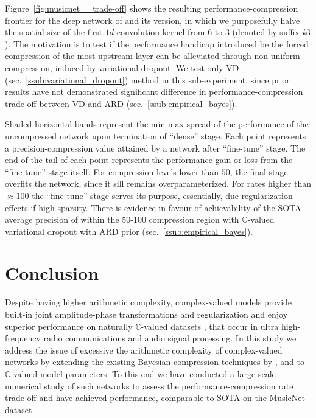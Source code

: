 \documentclass[a4paper,10pt]{article}
\newcommand{\cplx}{\mathbb{C}}
\begin{document}
Figure~\ref{fig:musicnet__trade-off} shows the resulting performance-compression frontier
for the deep network of \citet{trabelsi_deep_2017} and its version, in which we purposefully
halve the spatial size of the first $1d$ convolution kernel from $6$ to $3$ (denoted by
suffix \textit{k}$3$). The motivation is to test if the performance handicap introduced be
the forced compression of the most upstream layer can be alleviated through non-uniform
compression, induced by variational dropout. We test only VD (sec.~\ref{ssub:variational_dropout})
method in this sub-experiment, since prior results have not demonstrated significant difference
in performance-compression trade-off between VD and ARD (sec.~\ref{ssub:empirical_bayes}).

Shaded horizontal bands represent the min-max spread of the performance of the uncompressed
network upon termination of ``dense'' stage. Each point represents a precision-compression
value attained by a network after ``fine-tune'' stage. The end of the tail of each point
represents the performance gain or loss from the ``fine-tune'' stage itself.
%
For compression levels lower than $50$, the final stage overfits the network, since
it sill remains overparameterized. For rates higher than $\approx 100$ the ``fine-tune''
stage serves its purpose, essentially, due regularization effects if high sparsity. There
is evidence in favour of achievability of the SOTA average precision of \citet{trabelsi_deep_2017}
within the $50$-$100$ compression region with $\cplx$-valued variational dropout with ARD
prior (sec.~\ref{ssub:empirical_bayes}).




\section{Conclusion} %
\label{sec:conclusion}

Despite having higher arithmetic complexity, complex-valued models provide built-in
joint amplitude-phase transformations and regularization \citep{hirose_complex-valued_2009}
and enjoy superior performance on naturally $\cplx$-valued datasets \citep{tarver_design_2019},
that occur in ultra high-frequency radio communications and audio signal processing. In this
study we address the issue of excessive the arithmetic complexity of complex-valued networks
by extending the existing Bayesian compression techniques by \citet{kingma_variational_2015},
\citet{molchanov_variational_2017} and \citet{kharitonov_variational_2018} to $\cplx$-valued
model parameters. To this end we have conducted a large scale numerical study of such networks
to assess the performance-compression rate trade-off and have achieved performance, comparable
to SOTA on the MusicNet dataset.
\end{document}
